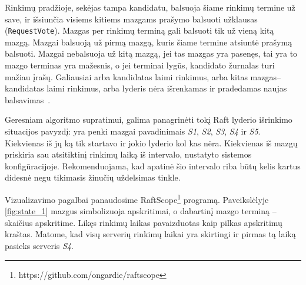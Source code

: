 \documentclass{VUMIFPSkursinis}
\begin{document}
Rinkimų pradžioje, sekėjas tampa kandidatu, balsuoja šiame rinkimų termine už save, ir išsiunčia visiems kitiems mazgams prašymo balsuoti užklausas (\texttt{RequestVote}). Mazgas per rinkimų terminą gali balsuoti tik už vieną kitą mazgą. Mazgai balsuoją už pirmą mazgą, kuris šiame termine atsiuntė prašymą balsuoti. Mazgai nebalsuoja už kitą mazgą, jei tas mazgas yra pasenęs, tai yra to mazgo terminas yra mažesnis, o jei terminai lygūs, kandidato žurnalas turi mažiau įrašų. Galiausiai arba kandidatas laimi rinkimus, arba kitas mazgas--kandidatas laimi rinkimus, arba lyderis nėra išrenkamas ir pradedamas naujas balsavimas~\cite{ongaro_consensus}.

Geresniam algoritmo supratimui, galima panagrinėti tokį Raft lyderio išrinkimo situacijos pavyzdį: yra penki mazgai pavadinimais \textit{S1}, \textit{S2}, \textit{S3}, \textit{S4} ir \textit{S5}. Kiekvienas iš jų ką tik startavo ir jokio lyderio kol kas nėra. Kiekvienas iš mazgų priskiria sau atsitiktinį rinkimų laiką iš intervalo, nustatyto sistemos konfigūracijoje. Rekomenduojama, kad apatinė šio intervalo riba būtų kelis kartus didesnė negu tikimasis žinučių uždelsimas tinkle. 

Vizualizavimo pagalbai panaudosime RaftScope\footnote{https://github.com/ongardie/raftscope} programą. Paveikslėlyje \ref{fig:state_1} mazgus simbolizuoja apskritimai, o dabartinį mazgo terminą -- skaičius apskritime. Likęs rinkimų laikas pavaizduotas kaip pilkas apskritimų kraštas. Matome, kad visų serverių rinkimų laikai yra skirtingi ir pirmas tą laiką pasieks serveris \textit{S4}.
\end{document}
